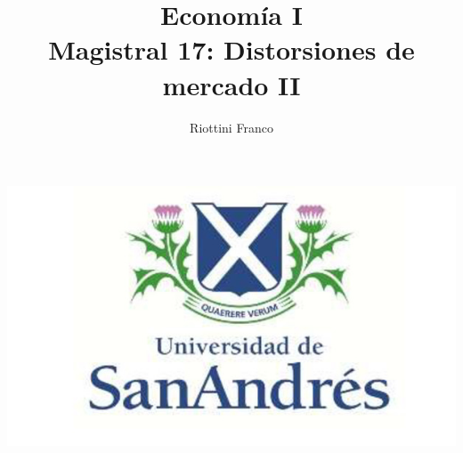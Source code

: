 \documentclass{beamer}
\title[Economía I]{Economía I \vspace{4mm}
\\ Magistral 17: Distorsiones de mercado II}
\date{}
\author[Franco Riottini]{Riottini Franco}
\institute[]{Universidad de San Andrés}
\begin{document}
\begin{frame}
\titlepage
\centering
\includegraphics[scale=0.2]{../Figures/logoUDESA.jpg} 
\end{frame}
\end{document}
